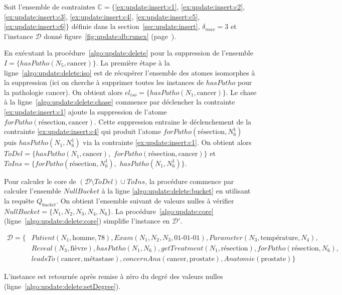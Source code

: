 \begin{example}
    Soit l'ensemble de contraintes $\mathbb{C} = \{$\ref{ex:update:insert:c1}, \ref{ex:update:insert:c2}, \ref{ex:update:insert:c3}, \ref{ex:update:insert:c4}, \ref{ex:update:insert:c5}, \ref{ex:update:insert:c6}$\}$ définie dans la section~\ref{sec:update:insert}, $\delta_{max} = 3$ et l'instance $\mathcal{D}$ donné figure~\ref{fig:update:db:runex} (page~\pageref{fig:update:db:runex}).

    En exécutant la procédure~\ref{algo:update:delete} pour la suppression de l'ensemble $I = \{ hasPatho(N_5, \text{cancer}) \}$.
    La première étape à la ligne~\ref{algo:update:delete:iso} est de récupérer l'ensemble des atomes isomorphes à la suppression (ici on cherche à supprimer toutes les instances de $hasPatho$ pour la pathologie cancer).
    On obtient alors $el_{iso} = \{ hasPatho(N_1, \text{cancer}) \}$.
    Le \gls{chase} à la ligne~\ref{algo:update:delete:chase} commence par déclencher la contrainte \ref{ex:update:insert:c1} ajoute la suppression de l'atome $forPatho(\text{résection}, \text{cancer})$.
    Cette suppression entraine le déclenchement de la contrainte \ref{ex:update:insert:c4} qui produit l'atome $forPatho(\text{résection}, N_6^1)$ puis $hasPatho(N_1, N_6^1)$ via la contrainte \ref{ex:update:insert:c1}.
    On obtient alors $ToDel = \{ hasPatho(N_1, \text{cancer}),$ $forPatho(\text{résection}, \text{cancer}) \}$ et $ToIns = \{ forPatho(\text{résection}, N_6^1),$ $hasPatho(N_1, N_6^1) \}$.

    Pour calculer le \gls{core} de $(\mathcal{D} \setminus ToDel) \cup ToIns$, la procédure commence par calculer l'ensemble $NullBucket$ à la ligne \ref{algo:update:delete:bucket} en utilisant la requête $Q_{bucket}$.
    On obtient l'ensemble suivant de valeurs nulles à vérifier $NullBucket = \{N_1, N_2, N_3, N_4, N_6\}$.
    La procédure~\ref{algo:update:core} (ligne~\ref{algo:update:delete:core}) simplifie l'instance en $\mathcal{D}'$.

    \begin{align*}
        \mathcal{D} = \{ & Patient(N_1, \text{homme}, 78), Exam(N_1, N_2, N_3, \text{01-01-01}), Parameter(N_3, \text{température}, N_4),        \\
                         & Reveal(N_3, \text{fièvre}), hasPatho(N_1, N_6), getTreatment(N_1, \text{résection}), forPatho(\text{résection}, N_6), \\
                         & leadsTo(\text{cancer}, \text{métastase}), concernAna(\text{cancer}, \text{prostate}), Anatomie(\text{prostate}) \}
    \end{align*}

    L'instance est retournée après remise à zéro du degré des valeurs nulles (ligne~\ref{algo:update:delete:setDegree}).
\end{example}
